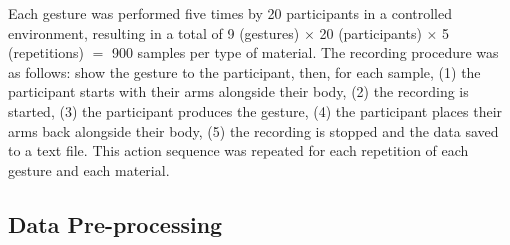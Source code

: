 Each gesture was performed five times by 20 participants in a controlled environment, resulting in a total of 9 (gestures) $\times$ 20 (participants) $\times$ 5 (repetitions) ${=}$ 900 samples per type of material. The recording procedure was as follows: show the gesture to the participant, then, for each sample, (1) the participant starts with their arms alongside their body, (2) the recording is started, (3) the participant produces the gesture, (4) the participant places their arms back alongside their body, (5) the recording is stopped and the data saved to a text file. This action sequence was repeated for each repetition of each gesture and each material. 

\subsection{Data Pre-processing} \label{sec:radar-experiments:data-collection:pre-processing}

